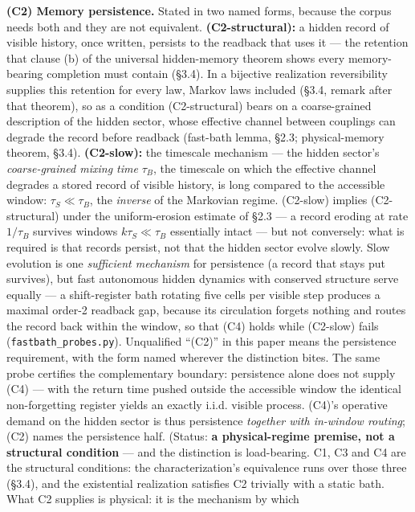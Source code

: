 \documentclass[
]{article}
\begin{document}
\textbf{(C2) Memory persistence.} Stated in two named forms, because the
corpus needs both and they are not equivalent. \textbf{(C2-structural):}
a hidden record of visible history, once written, persists to the
readback that uses it --- the retention that clause (b) of the universal
hidden-memory theorem shows every memory-bearing completion must contain
(§3.4). In a bijective realization reversibility supplies this retention
for every law, Markov laws included (§3.4, remark after that theorem),
so as a condition (C2-structural) bears on a coarse-grained description
of the hidden sector, whose effective channel between couplings can
degrade the record before readback (fast-bath lemma, §2.3;
physical-memory theorem, §3.4). \textbf{(C2-slow):} the timescale
mechanism --- the hidden sector's \emph{coarse-grained mixing time}
\(\tau_B\), the timescale on which the effective channel degrades a
stored record of visible history, is long compared to the accessible
window: \(\tau_S \ll \tau_B\), the \emph{inverse} of the Markovian
regime. (C2-slow) implies (C2-structural) under the uniform-erosion
estimate of §2.3 --- a record eroding at rate \(1/\tau_B\) survives
windows \(k\tau_S \ll \tau_B\) essentially intact --- but not
conversely: what is required is that records persist, not that the
hidden sector evolve slowly. Slow evolution is one \emph{sufficient
mechanism} for persistence (a record that stays put survives), but fast
autonomous hidden dynamics with conserved structure serve equally --- a
shift-register bath rotating five cells per visible step produces a
maximal order-2 readback gap, because its circulation forgets nothing
and routes the record back within the window, so that (C4) holds while
(C2-slow) fails (\texttt{fastbath\_probes.py}). Unqualified ``(C2)'' in
this paper means the persistence requirement, with the form named
wherever the distinction bites. The same probe certifies the
complementary boundary: persistence alone does not supply (C4) --- with
the return time pushed outside the accessible window the identical
non-forgetting register yields an exactly i.i.d. visible process. (C4)'s
operative demand on the hidden sector is thus persistence \emph{together
with in-window routing}; (C2) names the persistence half. (Status:
\textbf{a physical-regime premise, not a structural condition} --- and
the distinction is load-bearing. C1, C3 and C4 are the structural
conditions: the characterization's equivalence runs over those three
(§3.4), and the existential realization satisfies C2 trivially with a
static bath. What C2 supplies is physical: it is the mechanism by which
\end{document}
